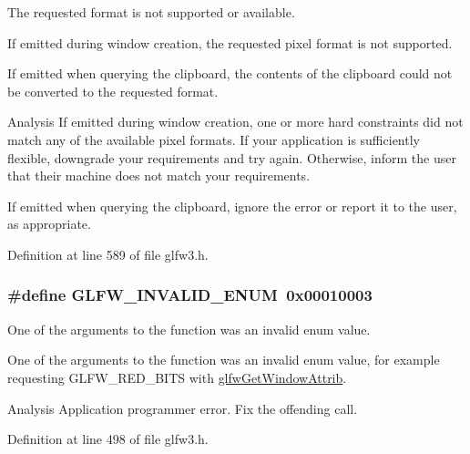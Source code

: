 The requested format is not supported or available. 

If emitted during window creation, the requested pixel format is not supported.

If emitted when querying the clipboard, the contents of the clipboard could not be converted to the requested format.

\begin{DoxyParagraph}{Analysis}
If emitted during window creation, one or more hard constraints did not match any of the available pixel formats. If your application is sufficiently flexible, downgrade your requirements and try again. Otherwise, inform the user that their machine does not match your requirements.
\end{DoxyParagraph}
\begin{DoxyParagraph}{}
If emitted when querying the clipboard, ignore the error or report it to the user, as appropriate. 
\end{DoxyParagraph}


Definition at line 589 of file glfw3.\+h.

\hypertarget{group__errors_ga76f6bb9c4eea73db675f096b404593ce}{}
\subsubsection[{G\+L\+F\+W\+\_\+\+I\+N\+V\+A\+L\+I\+D\+\_\+\+E\+N\+U\+M}]{\setlength{\rightskip}{0pt plus 5cm}\#define G\+L\+F\+W\+\_\+\+I\+N\+V\+A\+L\+I\+D\+\_\+\+E\+N\+U\+M~0x00010003}\label{group__errors_ga76f6bb9c4eea73db675f096b404593ce}


One of the arguments to the function was an invalid enum value. 

One of the arguments to the function was an invalid enum value, for example requesting G\+L\+F\+W\+\_\+\+R\+E\+D\+\_\+\+B\+I\+T\+S with \hyperlink{group__window_ga1bb0c7e100418e284dbb800789c63d40}{glfw\+Get\+Window\+Attrib}.

\begin{DoxyParagraph}{Analysis}
Application programmer error. Fix the offending call. 
\end{DoxyParagraph}


Definition at line 498 of file glfw3.\+h.


